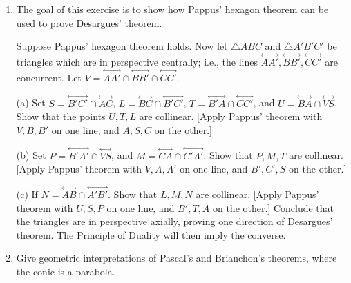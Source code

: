 \documentclass[leqno]{book}
\begin{document}
\begin{enumerate}
\item The goal of this exercise is to show how Pappus' hexagon theorem can be used to prove Desargues' theorem. %

Suppose Pappus' hexagon theorem holds.  Now let $\triangle ABC$ and $\triangle A'B'C'$ be triangles which are in perspective centrally; i.e., the lines $\overset{\longleftrightarrow}{AA'},\overset{\longleftrightarrow}{BB'},\overset{\longleftrightarrow}{CC'}$ are concurrent.  Let $V=\overset{\longleftrightarrow}{AA'}\cap\overset{\longleftrightarrow}{BB'}\cap\overset{\longleftrightarrow}{CC'}$.

(a) Set $S=\overset{\longleftrightarrow}{B'C'}\cap\overset{\longleftrightarrow}{AC}$, $L=\overset{\longleftrightarrow}{BC}\cap\overset{\longleftrightarrow}{B'C'}$, $T=\overset{\longleftrightarrow}{B'A}\cap\overset{\longleftrightarrow}{CC'}$, and $U=\overset{\longleftrightarrow}{BA}\cap\overset{\longleftrightarrow}{VS}$.  Show that the points $U,T,L$ are collinear.  [Apply Pappus' theorem with $V,B,B'$ on one line, and $A,S,C$ on the other.]

(b) Set $P=\overset{\longleftrightarrow}{B'A'}\cap\overset{\longleftrightarrow}{VS}$, and $M=\overset{\longleftrightarrow}{CA}\cap\overset{\longleftrightarrow}{C'A'}$.  Show that $P,M,T$ are collinear.  [Apply Pappus' theorem with $V,A,A'$ on one line, and $B',C',S$ on the other.]

(c) If $N=\overset{\longleftrightarrow}{AB}\cap\overset{\longleftrightarrow}{A'B'}$.  Show that $L,M,N$ are collinear.  [Apply Pappus' theorem with $U,S,P$ on one line, and $B',T,A$ on the other.]  Conclude that the triangles are in perspective axially, proving one direction of Desargues' theorem.  The Principle of Duality will then imply the converse.

\item Give geometric interpretations of Pascal's and Brianchon's theorems, where the conic is a parabola.
\end{enumerate}
\end{document}
